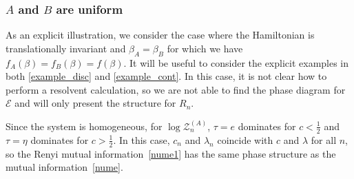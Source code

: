 \documentclass[a4paper,11pt]{article}
\newcommand\half{{\ensuremath{\frac{1}{2}}}}
\def\b{{\beta}}
\newcommand\lam{\lambda}
\newcommand\ha{{\half}}
\newcommand\sE{{\ensuremath{{\mathcal E}}}}
\newcommand\sZ{{\mathcal Z}}
\begin{document}
\subsubsection{$A$ and $B$ are uniform} 


As an explicit illustration, we consider the case where the Hamiltonian is translationally invariant and $\b_A = \b_B$ for which 
we have $f_A (\b)= f_B (\b) = f (\b)$. It will be useful to consider the explicit examples in both \eqref{example_disc} and \eqref{example_cont}. In this case, it is not clear how to perform a resolvent calculation, so we are not able to find the phase diagram for $\sE$ and will only present the structure for $R_n$. 

Since the system is homogeneous, for $\log \sZ_n^{(A)}$, $\tau =e$ dominates for $c < \ha$ and $\tau = \eta$ dominates for $c >\ha$. In this case, $c_n$ and $\lam_n$ coincide with $c$ and $\lam$ for all $n$, so the Renyi mutual information~\eqref{nume1} has 
the same phase structure as the mutual information~\eqref{nume}. 

\end{document}
